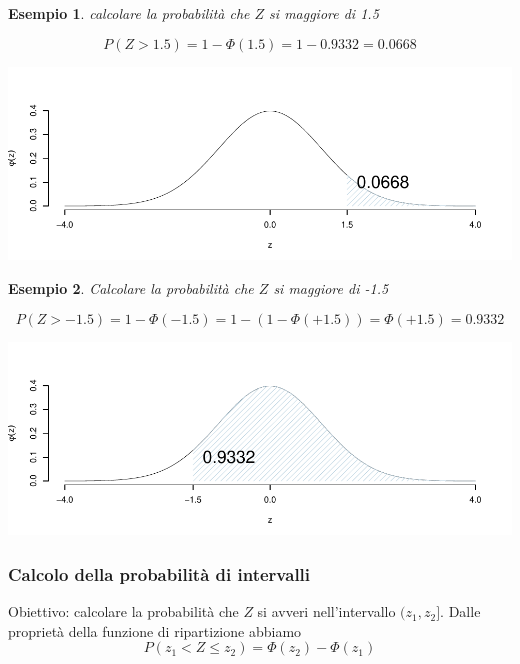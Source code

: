 \documentclass[
  11pt,
]{book}
\theoremstyle{mytheoremstyle}
\theoremstyle{mydefstyle}
\newtheorem{example}{{Esempio}}[section]
\begin{document}
\begin{example}

calcolare la probabilità che \(Z\) si maggiore di 1.5

\[P(Z > 1.5) = 1-\Phi(1.5)=1-0.9332=0.0668\]

\begin{center}\includegraphics{Appunti_di_Statistica_2025_files/figure-latex/07c-Normale-17,-1} \end{center}

\end{example}

\begin{example}

Calcolare la probabilità che \(Z\) si maggiore di -1.5

\[P(Z > -1.5) = 1-\Phi(-1.5)=1-(1-\Phi(+1.5))=\Phi(+1.5)=0.9332\]

\begin{center}\includegraphics{Appunti_di_Statistica_2025_files/figure-latex/07c-Normale-19,-1} \end{center}

\end{example}

\subsubsection{Calcolo della probabilità di intervalli}\label{calcolo-della-probabilituxe0-di-intervalli}

Obiettivo: calcolare la probabilità che \(Z\) si avveri nell'intervallo \((z_1,z_2]\).
Dalle proprietà della funzione di ripartizione abbiamo
\[P(z_1<Z\leq z_2) = \Phi(z_2)-\Phi(z_1)\]
\end{document}
